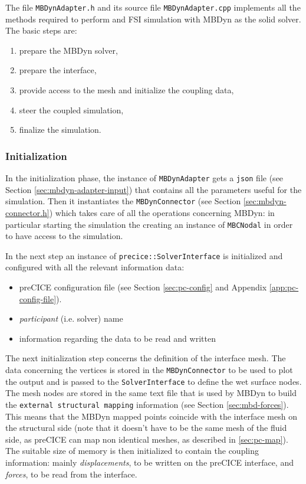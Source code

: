 The file \texttt{MBDynAdapter.h} and its source file \texttt{MBDynAdapter.cpp} implements all the methods required to perform and FSI simulation with MBDyn as the solid solver. The basic steps are:

\begin{enumerate}
	\item prepare the MBDyn solver,
	\item prepare the interface,
	\item provide access to the mesh and initialize the coupling data,
	\item steer the coupled simulation,
	\item finalize the simulation.
\end{enumerate}

\subsubsection{Initialization}

In the initialization phase, the instance of \texttt{MBDynAdapter} gets a \texttt{json} file (see Section \ref{sec:mbdyn-adapter-input}) that contains all the parameters useful for the simulation.
Then it instantiates the \texttt{MBDynConnector} (see Section \ref{sec:mbdyn-connector.h}) which takes care of all the operations concerning MBDyn: in particular starting the simulation the creating an instance of \texttt{MBCNodal} in order to have access to the simulation.

In the next step an instance of \texttt{precice::SolverInterface} is initialized and configured with all the relevant information data:

\begin{itemize}
	\item preCICE configuration file (see Section \ref{sec:pc-config} and Appendix \ref{app:pc-config-file}).
	\item \textit{participant} (i.e. solver) name
	\item information regarding the data to be read and written
\end{itemize} 

The next initialization step concerns the definition of the interface mesh. The data concerning the vertices is stored in the \texttt{MBDynConnector} to be used to plot the output and is passed to the \texttt{SolverInterface} to define the wet surface nodes. The mesh nodes are stored in the same text file that is used by MBDyn to build the \texttt{external structural mapping} information (see Section \ref{sec:mbd-forces}). This means that the MBDyn mapped points coincide with the interface mesh on the structural side (note that it doesn't have to be the same mesh of the fluid side, as preCICE can map non identical meshes, as described in \ref{sec:pc-map}). The suitable size of memory is then initialized to contain the coupling information: mainly \textit{displacements}, to be written on the preCICE interface, and \textit{forces}, to be read from the interface.


